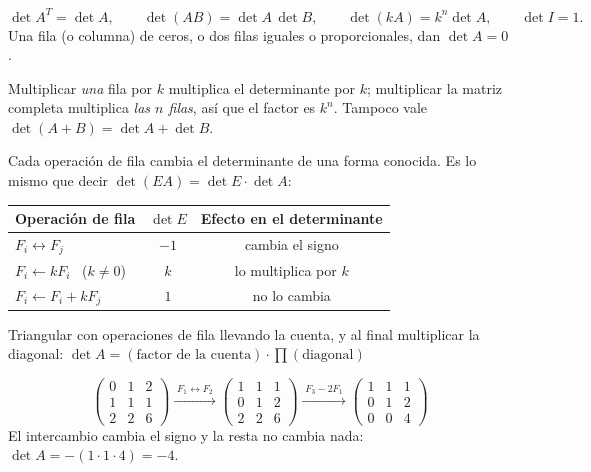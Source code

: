 \documentclass[11pt,a4paper]{article}
\newcommand{\op}[1]{\xrightarrow{\;#1\;}}
\let\zukanivel\nivel
\renewcommand{\nivel}[2]{\needspace{10\baselineskip}\zukanivel{#1}{#2}}
\begin{document}
\begin{propiedad}
\[ \det A^T=\det A,\qquad \det(AB)=\det A\,\det B,\qquad \det(kA)=k^n\det A,\qquad \det I=1. \]
Una fila (o columna) de ceros, o dos filas iguales o proporcionales, dan $\det A=0$.
\end{propiedad}

\begin{ojo}
Multiplicar \emph{una} fila por $k$ multiplica el determinante por $k$; multiplicar la matriz completa multiplica
\emph{las $n$ filas}, así que el factor es $k^n$. Tampoco vale $\det(A+B)=\det A+\det B$.
\end{ojo}


Cada operación de fila cambia el determinante de una forma conocida. Es lo mismo que decir
$\det(EA)=\det E\cdot\det A$:
\begin{center}
\begin{tabular}{@{}l c c@{}}
\toprule
Operación de fila & $\det E$ & Efecto en el determinante\\ \midrule
$F_i\leftrightarrow F_j$ & $-1$ & cambia el signo\\
$F_i\leftarrow kF_i$ \ ($k\neq0$) & $k$ & lo multiplica por $k$\\
$F_i\leftarrow F_i+kF_j$ & $1$ & no lo cambia\\
\bottomrule
\end{tabular}
\end{center}

\begin{clavebox}[EL MÉTODO]
Triangular con operaciones de fila llevando la cuenta, y al final multiplicar la diagonal:\quad
$\displaystyle \det A=(\text{factor de la cuenta})\cdot\prod(\text{diagonal})$
\end{clavebox}

\begin{ejemplo}
\[ \begin{pmatrix} 0 & 1 & 2\\ 1 & 1 & 1\\ 2 & 2 & 6\end{pmatrix}
\op{F_1\leftrightarrow F_2}\begin{pmatrix} 1 & 1 & 1\\ 0 & 1 & 2\\ 2 & 2 & 6\end{pmatrix}
\op{F_3-2F_1}\begin{pmatrix} 1 & 1 & 1\\ 0 & 1 & 2\\ 0 & 0 & 4\end{pmatrix} \]
El intercambio cambia el signo y la resta no cambia nada: $\det A=-(1\cdot1\cdot4)=-4$.
\end{ejemplo}
\end{document}

